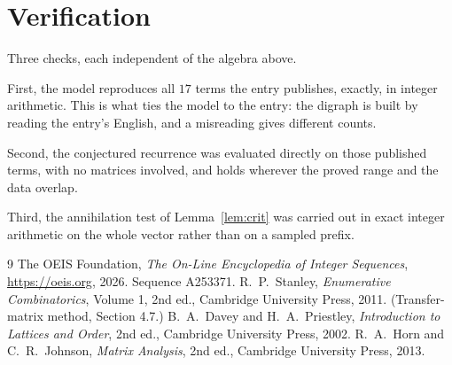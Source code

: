 \documentclass[11pt,a4paper]{article}
\theoremstyle{plain}
\theoremstyle{definition}
\begin{document}
\section{Verification}

Three checks, each independent of the algebra above.

First, the model reproduces all $17$ terms the entry publishes, exactly, in integer
arithmetic. This is what ties the model to the entry: the digraph is built by reading the
entry's English, and a misreading gives different counts.

Second, the conjectured recurrence was evaluated directly on those published terms, with no
matrices involved, and holds wherever the proved range and the data overlap.

Third, the annihilation test of Lemma~\ref{lem:crit} was carried out in exact integer
arithmetic on the whole vector rather than on a sampled prefix.

\begin{thebibliography}{9}
 The OEIS Foundation, \emph{The On-Line Encyclopedia of Integer
Sequences}, \url{https://oeis.org}, 2026. Sequence A253371.
 R.~P.~Stanley, \emph{Enumerative Combinatorics}, Volume 1, 2nd ed.,
Cambridge University Press, 2011. (Transfer-matrix method, Section 4.7.)
 B.~A.~Davey and H.~A.~Priestley, \emph{Introduction to Lattices and
Order}, 2nd ed., Cambridge University Press, 2002.
 R.~A.~Horn and C.~R.~Johnson, \emph{Matrix Analysis}, 2nd ed., Cambridge
University Press, 2013.
\end{thebibliography}
\end{document}
